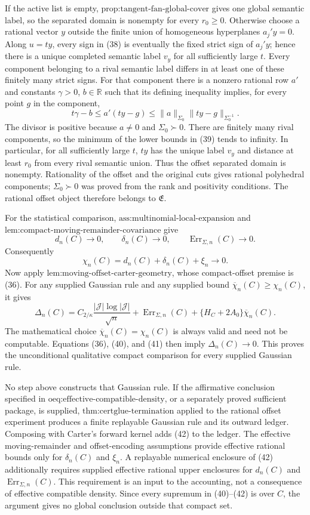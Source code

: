If the active list is empty, \(\text{prop:tangent-fan-global-cover}\) gives one global semantic label, so the separated domain is nonempty for every \(r_0\ge0\).  Otherwise choose a rational vector \(y\) outside the finite union of homogeneous hyperplanes \(a_j'y=0\).  Along \(u=ty\), every sign in (38) is eventually the fixed strict sign of \(a_j'y\); hence there is a unique completed semantic label \(v_y\) for all sufficiently large \(t\).  Every component belonging to a rival semantic label differs in at least one of these finitely many strict signs.  For that component there is a nonzero rational row \(a'\) and constants \(\gamma>0\), \(b\in\mathbb R\) such that its defining inequality implies, for every point \(g\) in the component,
\[
 t\gamma-b\le a'(ty-g)
 \le \|a\|_{\Sigma_0}\|ty-g\|_{\Sigma_0^{-1}}.
 \tag{39}
\]
The divisor is positive because \(a\ne0\) and \(\Sigma_0\succ0\).  There are finitely many rival components, so the minimum of the lower bounds in (39) tends to infinity.  In particular, for all sufficiently large \(t\), \(ty\) has the unique label \(v_y\) and distance at least \(r_0\) from every rival semantic union.  Thus the offset separated domain is nonempty.  Rationality of the offset and the original cuts gives rational polyhedral components; \(\Sigma_0\succ0\) was proved from the rank and positivity conditions.  The rational offset object therefore belongs to \(\mathfrak E\).

For the statistical comparison, \(\text{ass:multinomial-local-expansion}\) and \(\text{lem:compact-moving-remainder-covariance}\) give
\[
 d_n(C)\to0,
 \qquad \delta_n(C)\to0,
 \qquad \operatorname{Err}_{\Sigma,n}(C)\to0.
 \tag{40}
\]
Consequently
\[
 \chi_n(C)=d_n(C)+\delta_n(C)+\xi_n\longrightarrow0.
 \tag{41}
\]
Now apply \(\text{lem:moving-offset-carter-geometry}\), whose compact-offset premise is (36).  For any supplied Gaussian rule and any supplied bound \(\overline\chi_n(C)\ge\chi_n(C)\), it gives
\[
 \Delta_n(C)=C_{2/\kappa}\frac{|\mathcal J|\log|\mathcal J|}{\sqrt n}
 +\operatorname{Err}_{\Sigma,n}(C)
 +\{H_C+2A_0\}\overline\chi_n(C).
 \tag{42}
\]
The mathematical choice \(\overline\chi_n(C)=\chi_n(C)\) is always valid and need not be computable.  Equations (36), (40), and (41) then imply \(\Delta_n(C)\to0\).  This proves the unconditional qualitative compact comparison for every supplied Gaussian rule.

No step above constructs that Gaussian rule.  If the affirmative conclusion specified in \(\text{oeq:effective-compatible-density}\), or a separately proved sufficient package, is supplied, \(\text{thm:certglue-termination}\) applied to the rational offset experiment produces a finite replayable Gaussian rule and its outward ledger.  Composing with Carter's forward kernel adds (42) to the ledger.  The effective moving-remainder and offset-encoding assumptions provide effective rational bounds only for \(\delta_n(C)\) and \(\xi_n\).  A replayable numerical enclosure of (42) additionally requires supplied effective rational upper enclosures for \(d_n(C)\) and \(\operatorname{Err}_{\Sigma,n}(C)\).  This requirement is an input to the accounting, not a consequence of effective compatible density.  Since every supremum in (40)--(42) is over \(C\), the argument gives no global conclusion outside that compact set.

